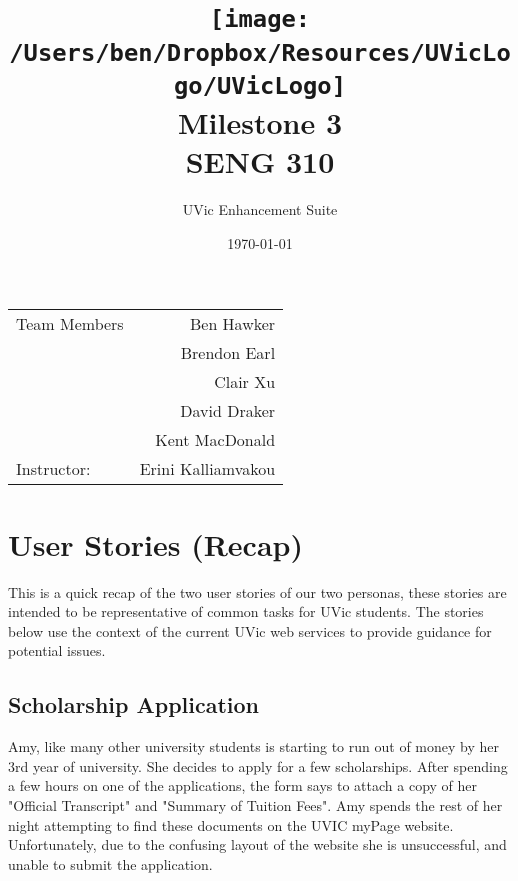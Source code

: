 \documentclass{article}
\title{\texttt{[image: /Users/ben/Dropbox/Resources/UVicLogo/UVicLogo]} \\ \vspace{7mm} Milestone 3 \\ SENG 310} %
\author{UVic Enhancement Suite} %
\date{\today} %
\begin{document}
\maketitle %

\begin{center}
\begin{tabular}{l r}
Team Members & Ben Hawker \\
 & Brendon Earl \\
 & Clair Xu \\
 & David Draker \\
 & Kent MacDonald \\
Instructor: & Erini Kalliamvakou  %
\end{tabular}
\end{center}


\tableofcontents
\pagebreak


\section{User Stories (Recap)}

This is a quick recap of the two user stories of our two personas, these stories are intended to be representative of common tasks for UVic students. The stories below use the context of the current UVic web services to provide guidance for potential issues.

\subsection{Scholarship Application}

Amy, like many other university students is starting to run out of money by her 3rd year of university. She decides to apply for a few scholarships. After spending a few hours on one of the applications, the form says to attach a copy of her "Official Transcript" and "Summary of Tuition Fees". Amy spends the rest of her night attempting to find these documents on the UVIC myPage website. Unfortunately, due to the confusing layout of the website she is unsuccessful, and unable to submit the application.
\end{document}
